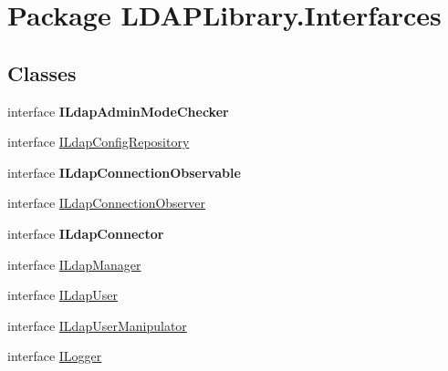 \hypertarget{namespace_l_d_a_p_library_1_1_interfarces}{}\section{Package L\+D\+A\+P\+Library.\+Interfarces}
\label{namespace_l_d_a_p_library_1_1_interfarces}
\subsection*{Classes}
\begin{DoxyCompactItemize}
\item 
interface {\bfseries I\+Ldap\+Admin\+Mode\+Checker}
\item 
interface \hyperlink{interface_l_d_a_p_library_1_1_interfarces_1_1_i_ldap_config_repository}{I\+Ldap\+Config\+Repository}
\item 
interface {\bfseries I\+Ldap\+Connection\+Observable}
\item 
interface \hyperlink{interface_l_d_a_p_library_1_1_interfarces_1_1_i_ldap_connection_observer}{I\+Ldap\+Connection\+Observer}
\item 
interface {\bfseries I\+Ldap\+Connector}
\item 
interface \hyperlink{interface_l_d_a_p_library_1_1_interfarces_1_1_i_ldap_manager}{I\+Ldap\+Manager}
\item 
interface \hyperlink{interface_l_d_a_p_library_1_1_interfarces_1_1_i_ldap_user}{I\+Ldap\+User}
\item 
interface \hyperlink{interface_l_d_a_p_library_1_1_interfarces_1_1_i_ldap_user_manipulator}{I\+Ldap\+User\+Manipulator}
\item 
interface \hyperlink{interface_l_d_a_p_library_1_1_interfarces_1_1_i_logger}{I\+Logger}
\end{DoxyCompactItemize}
